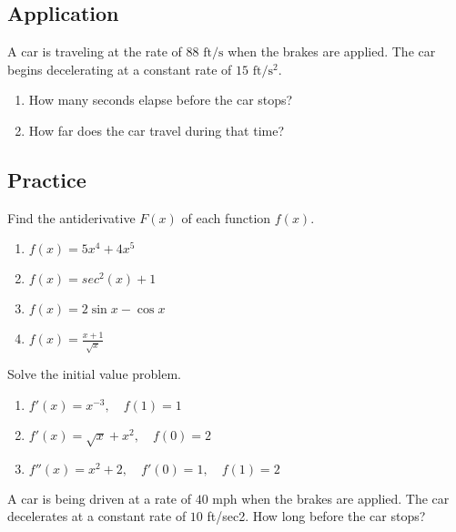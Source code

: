 \hypertarget{application}{%
\subsection{Application}\label{application}}

\begin{example}

A car is traveling at the rate of \(88 \text{ ft}/\text{s}\) when the
brakes are applied. The car begins decelerating at a constant rate of
\(15 \text{ ft}/\text{s}^2.\)

\begin{enumerate}
\item
  How many seconds elapse before the car stops?
\item
  How far does the car travel during that time?
\end{enumerate}

\end{example}

\hypertarget{practice}{%
\subsection{Practice}\label{practice}}

\begin{exercise}

Find the antiderivative \(F(x)\) of each function \(f(x).\)

\begin{enumerate}
\item
  \(f(x)=5x^4+4x^5\)
\item
  \(f(x)=sec^2(x)+1\)
\item
  \(f(x)=2\sin x-\cos x\)
\item
  \(f(x)=\frac{x+1}{\sqrt{x}}\)
\end{enumerate}

\end{exercise}

\begin{exercise}

Solve the initial value problem.

\begin{enumerate}
\item
  \(f'(x)=x^{-3},\quad f(1)=1\)
\item
  \(f'(x)=\sqrt{x}+x^2,\quad f(0)=2\)
\item
  \(f''(x)=x^2+2,\quad f'(0)=1,\quad f(1)=2\)
\end{enumerate}

\end{exercise}

\begin{exercise}

A car is being driven at a rate of \(40\) mph when the brakes are
applied. The car decelerates at a constant rate of \(10\) ft/sec2. How
long before the car stops?

\end{exercise}

